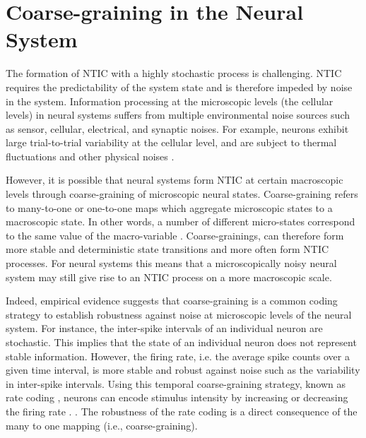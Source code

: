 \documentclass[utf8]{article}
\begin{document}
	\section{Coarse-graining in the Neural System} \label{sec:Neural coarse-graining}

		The formation of NTIC with a  highly stochastic process is challenging. NTIC requires the predictability of the system state and is therefore impeded by noise in the system. Information processing at the microscopic levels (the cellular levels) in neural systems suffers from multiple environmental noise sources such as sensor, cellular, electrical, and synaptic noises. For example, neurons exhibit large trial-to-trial variability at the cellular level, and are subject to thermal fluctuations and other physical noises \citep{faisal2008noise}. 
		
  
		However, it is possible that neural systems form NTIC at certain macroscopic levels through coarse-graining of microscopic neural states. Coarse-graining refers to many-to-one or one-to-one maps which aggregate microscopic states to a macroscopic state. In other words, a number of different micro-states correspond to the same value of the macro-variable \citep{price2007causation}. Coarse-grainings, can therefore form more stable and deterministic state transitions and more often form NTIC processes. For neural systems this means that a microscopically noisy neural system may still give rise to an NTIC process on a more macroscopic scale.
		
		Indeed, empirical evidence suggests that coarse-graining is a common coding strategy to establish robustness against noise at microscopic levels of the neural system. For instance, the inter-spike intervals of an individual neuron are stochastic. This implies that the state of an individual neuron does not represent stable information. However, the firing rate, i.e. the average spike counts over a given time interval, is more stable and robust against noise such as the variability in inter-spike intervals. Using this temporal coarse-graining strategy, known as rate coding \citep{adrian1926impulses, gerstner2002spiking, maass2001pulsed, panzeri2015neural, stein2005neuronal}, neurons can encode stimulus intensity by increasing or decreasing the firing rate \citep{kandel2000principles}. \citep{stein2005neuronal}. The robustness of the rate coding is a direct consequence of the many to one mapping (i.e., coarse-graining).
		
\end{document}
